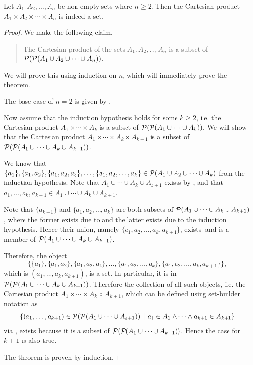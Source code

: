 \begin{theorem}
    Let $A_1, A_2, \dots, A_n$ be non-empty sets where $n \geq 2$. Then the Cartesian product $A_1 \times A_2 \times \cdots \times A_n$ is indeed a set.
\end{theorem}
\begin{proof}
    We make the following claim.
    \begin{quote}
        The Cartesian product of the sets $A_1, A_2, \dots, A_n$ is a subset of ${\mathcal{P}({\mathcal{P}(A_1 \cup A_2 \cup \cdots \cup A_n)})}$.
    \end{quote}
    We will prove this using induction on $n$, which will immediately prove the theorem.

    The base case of $n = 2$ is given by .

    Now assume that the induction hypothesis holds for some $k \geq 2$, i.e. the Cartesian product $A_1 \times \cdots \times A_k$ is a subset of ${\mathcal{P}({\mathcal{P}(A_1 \cup \cdots \cup A_k)})}$. We will show that the Cartesian product $A_1 \times \cdots \times A_k \times A_{k+1}$ is a subset of ${\mathcal{P}({\mathcal{P}(A_1 \cup \cdots \cup A_k \cup A_{k+1})})}$.

    We know that $\{a_1\}, \{a_1, a_2\}, \{a_1, a_2, a_3\}, \dots, \{a_1, a_2, \dots, a_k\} \in {\mathcal{P}(A_1 \cup A_2 \cup \cdots \cup A_k)}$ from the induction hypothesis. Note that $A_1 \cup \cdots \cup A_k \cup A_{k+1}$ exists by , and that $a_1, \dots, a_k, a_{k+1} \in A_1 \cup \cdots \cup A_k \cup A_{k+1}$.

    Note that $\{a_{k+1}\}$ and $\{a_1, a_2, \dots, a_k\}$ are both subsets of ${\mathcal{P}(A_1 \cup \cdots \cup A_k \cup A_{k+1})}$, where the former exists due to  and the latter exists due to the induction hypothesis. Hence their union, namely $\{a_1, a_2, \dots, a_k, a_{k+1}\}$, exists, and is a member of ${\mathcal{P}(A_1 \cup \cdots \cup A_k \cup A_{k+1})}$.

    Therefore, the object
    \[
        \{\{a_1\}, \{a_1, a_2\}, \{a_1, a_2, a_3\}, \dots, \{a_1, a_2, \dots, a_k\}, \{a_1, a_2, \dots, a_k, a_{k+1}\}\},
    \]
    which is $(a_1, \dots, a_k, a_{k+1})$, is a set. In particular, it is in ${\mathcal{P}({\mathcal{P}(A_1 \cup \cdots \cup A_k \cup A_{k+1})})}$. Therefore the collection of all such objects, i.e. the Cartesian product $A_1 \times \cdots \times A_k \times A_{k+1}$, which can be defined using set-builder notation as
    \[
        \left\{(a_1, \dots, a_{k+1}) \in \Power{\Power{A_1 \cup \cdots \cup A_{k+1}}} \vert a_1 \in A_1 \land \cdots \land a_{k+1} \in A_{k+1}\right\}
    \]
    via , exists because it is a subset of ${\mathcal{P}({\mathcal{P}(A_1 \cup \cdots \cup A_{k+1})})}$. Hence the case for $k + 1$ is also true.

    The theorem is proven by induction.
\end{proof}

